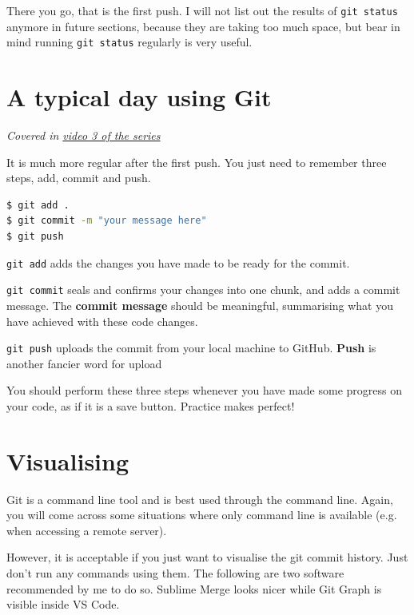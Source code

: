 There you go, that is the first push. I will not list out the results of \texttt{git status} anymore in future sections, because they are taking too much space, but bear in mind running \texttt{git status} regularly is very useful.

\section{A typical day using Git}
\label{sec:gcmsg}

\textit{Covered in \href{https://www.youtube.com/watch?v=wQmFz-Ggxuo&list=PLjGmdnqrOKuYXiu7lgG5HW71jPEUd1XCm&index=4}{video 3 of the series}}
\vspace{6mm}

It is much more regular after the first push. You just need to remember three steps, add, commit and push.

\begin{lstlisting}[language=bash]
$ git add .
$ git commit -m "your message here"
$ git push
\end{lstlisting}

\texttt{git add} adds the changes you have made to be ready for the commit. 

\texttt{git commit} seals and confirms your changes into one chunk, and adds a commit message. The \textbf{commit message} should be meaningful, summarising what you have achieved with these code changes.

\texttt{git push} uploads the commit from your local machine to GitHub. \textbf{Push} is another fancier word for upload
\vspace{6mm}

You should perform these three steps whenever you have made some progress on your code, as if it is a save button. Practice makes perfect!

\section{Visualising}
\label{sec:sublime}
Git is a command line tool and is best used through the command line. Again, you will come across some situations where only command line is available (e.g. when accessing a remote server). 

However, it is acceptable if you just want to visualise the git commit history. Just don't run any commands using them. The following are two software recommended by me to do so. Sublime Merge looks nicer while Git Graph is visible inside VS Code. 

